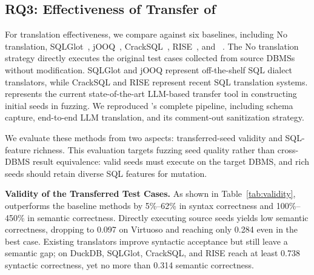 \documentclass[conference]{IEEEtran}
\begin{document}
\subsection{RQ3: Effectiveness of Transfer of \tool{}}
For translation effectiveness, we compare \tool{} against six baselines, including No translation, SQLGlot~\cite{sqlglot}, jOOQ~\cite{jooq}, CrackSQL~\cite{zhou2025cracking}, RISE~\cite{xie2026rise}, and \sedar{}~\cite{fu2024sedar}. 
The No translation strategy directly executes the original test cases collected from source DBMSs without modification. 
SQLGlot and jOOQ represent off-the-shelf SQL dialect translators, while CrackSQL and RISE represent recent SQL translation systems.
\sedar{} represents the current state-of-the-art LLM-based transfer tool in constructing initial seeds in fuzzing. 
We reproduced \sedar{}'s complete pipeline, including schema capture, end-to-end LLM translation, and its comment-out sanitization strategy.


We evaluate these methods from two aspects: transferred-seed validity and SQL-feature richness.
This evaluation targets fuzzing seed quality rather than cross-DBMS result equivalence: valid seeds must execute on the target DBMS, and rich seeds should retain diverse SQL features for mutation.

\textbf{Validity of the Transferred Test Cases.}
As shown in Table~\ref{tab:validity}, \tool{} outperforms the baseline methods by 5\%--62\% in syntax correctness and 100\%--450\% in semantic correctness.
Directly executing source seeds yields low semantic correctness, dropping to 0.097 on Virtuoso and reaching only 0.284 even in the best case.
Existing translators improve syntactic acceptance but still leave a semantic gap; on DuckDB, SQLGlot, CrackSQL, and RISE reach at least 0.738 syntactic correctness, yet no more than 0.314 semantic correctness.
\end{document}
